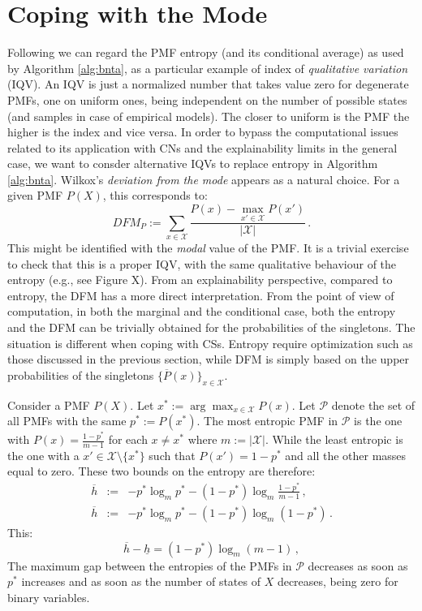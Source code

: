 \documentclass[runningheads]{llncs}
\begin{document}
\section{Coping with the Mode}\label{sec:mode}
Following \cite{wilcox1973indices} we can regard the PMF entropy (and its conditional average) as used by Algorithm \ref{alg:bnta}, as a particular example of index of \emph{qualitative variation} (IQV). An IQV is just a normalized number that takes value zero for degenerate PMFs, one on uniform ones, being independent on the number of possible states (and samples in case of empirical models). The closer to uniform is the PMF the higher is the index and vice versa. In order to bypass the computational issues related to its application with CNs and the explainability limits in the general case, we want to consder alternative IQVs to replace entropy in Algorithm \ref{alg:bnta}. Wilkox's \emph{deviation from the mode} appears as a natural choice. For a given PMF $P(X)$, this corresponds to:
\begin{equation}DFM_P:=\sum_{x\in\mathcal{X}} \frac{P(x) - \max_{x'\in\mathcal{X}} P(x')}{|\mathcal{X}|}\,.
\end{equation}
This might be identified with the \emph{modal} value of the PMF. It is a trivial exercise to check that this is a proper IQV, with the same qualitative behaviour of the entropy (e.g., see Figure X). From an explainability perspective, compared to entropy, the DFM has a more direct interpretation. From the point of view of computation, in both the marginal and the conditional case, both the entropy and the DFM can be trivially obtained for the probabilities of the singletons. The situation is different when coping with CSs. Entropy require optimization such as those discussed in the previous section, while DFM is simply based on the upper probabilities of the singletons $\{\overline{P}(x)\}_{x\in\mathcal{X}}$.

Consider a PMF $P(X)$. Let $x^*:=\arg\max_{x\in\mathcal{X}} P(x)$. Let $\mathcal{P}$
denote the set of all PMFs with the same $p^*:=P(x^*)$. The most entropic PMF in 
$\mathcal{P}$ is the one with  $P(x)=\frac{1-p^*}{m-1}$ for each $x\neq x^*$ where 
$m:=|\mathcal{X}|$. While the least entropic is the one with a 
$x'\in\mathcal{X}\setminus\{x^*\}$ such that $P(x')=1-p^*$ and all the other masses 
equal to zero. These two bounds on the entropy are therefore:
\begin{eqnarray}
\overline{h}&:=& -p^* \log_m p^* - (1-p^*) \log_m \frac{1-p^*}{m-1}\,,\\
\overline{h}&:=& -p^* \log_m p^* - (1-p^*) \log_m (1-p^*)\,.
\end{eqnarray}
This:
\begin{equation}
\overline{h}-\underline{h}=(1-p^*) \log_m (m-1)\,,
\end{equation}
The maximum gap between the entropies of the PMFs in $\mathcal{P}$ decreases as 
soon as $p^*$ increases and as soon as the number of states of $X$ decreases, being 
zero for binary variables.
\end{document}
